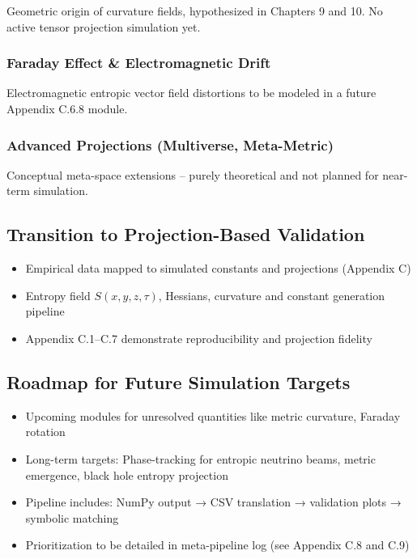 \documentclass[10.5pt,a4paper]{article}
\begin{document}
Geometric origin of curvature fields, hypothesized in Chapters 9 and 10. No active tensor projection simulation yet.

\subsubsection{Faraday Effect \& Electromagnetic Drift}

Electromagnetic entropic vector field distortions to be modeled in a future Appendix C.6.8 module.

\subsubsection{Advanced Projections (Multiverse, Meta-Metric)}

Conceptual meta-space extensions – purely theoretical and not planned for near-term simulation.

\subsection{Transition to Projection-Based Validation}

\begin{itemize}
  \item Empirical data mapped to simulated constants and projections (Appendix C)
  \item Entropy field \( S(x,y,z,\tau) \), Hessians, curvature and constant generation pipeline
  \item Appendix C.1--C.7 demonstrate reproducibility and projection fidelity
\end{itemize}

\subsection{Roadmap for Future Simulation Targets}

\begin{itemize}
  \item Upcoming modules for unresolved quantities like metric curvature, Faraday rotation
  \item Long-term targets: Phase-tracking for entropic neutrino beams, metric emergence, black hole entropy projection
  \item Pipeline includes: NumPy output → CSV translation → validation plots → symbolic matching
  \item Prioritization to be detailed in meta-pipeline log (see Appendix C.8 and C.9)
\end{itemize}
\end{document}
